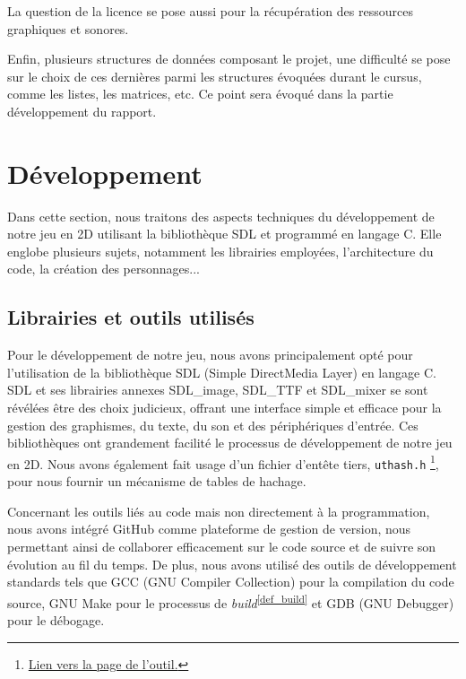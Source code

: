 \documentclass[a4paper,12pt]{article}
\newcommand\refsuscrite[1]{\textsuperscript{\ref{#1}}}
\begin{document}
La question de la licence se pose aussi pour la récupération des ressources graphiques et sonores.

Enfin, plusieurs structures de données composant le projet, une difficulté se pose sur le choix de ces dernières parmi les structures évoquées durant le cursus, comme les listes, les matrices, etc.
Ce point sera évoqué dans la partie développement du rapport.


\section{Développement}

Dans cette section, nous traitons des aspects techniques du développement de notre jeu en 2D utilisant la bibliothèque SDL et programmé en langage C. Elle englobe plusieurs sujets, notamment les librairies employées, l'architecture du code, la création des personnages...

\subsection{Librairies et outils utilisés}

Pour le développement de notre jeu, nous avons principalement opté pour l'utilisation de la bibliothèque SDL (Simple DirectMedia Layer) en langage C.
SDL et ses librairies annexes SDL\_image, SDL\_TTF et SDL\_mixer se sont révélées être des choix judicieux, offrant une interface simple et efficace pour la gestion des graphismes, du texte, du son et des périphériques d'entrée.
Ces bibliothèques ont grandement facilité le processus de développement de notre jeu en 2D.
Nous avons également fait usage d’un fichier d’entête tiers, \texttt{uthash.h} \footnote{\href{https://troydhanson.github.io/uthash/userguide.html}{Lien vers la page de l’outil.}}, pour nous fournir un mécanisme de tables de hachage.

Concernant les outils liés au code mais non directement à la programmation, nous avons intégré GitHub comme plateforme de gestion de version, nous permettant ainsi de collaborer efficacement sur le code source et de suivre son évolution au fil du temps.
De plus, nous avons utilisé des outils de développement standards tels que GCC (GNU Compiler Collection) pour la compilation du code source, GNU Make pour le processus de \textit{build}\refsuscrite{def_build} et GDB (GNU Debugger) pour le débogage.
\end{document}
